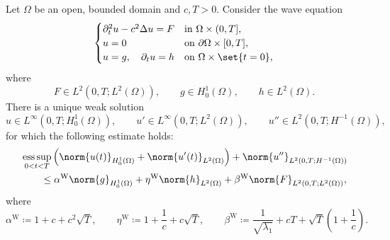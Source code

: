 \begin{theorem}\label{thm:wave-estimates}
Let \(\Omega\) be an open, bounded domain and $c, T > 0$. Consider the wave equation
\begin{equation}\label{eq:wave-general}
\begin{cases}
\partial_t^2 u-c^2\Delta u=F & \text{in }\Omega\times(0,T],\\
u=0 & \text{on }\partial\Omega\times[0,T],\\
u=g,\quad \partial_t u=h & \text{on }\Omega\times\set{t=0},
\end{cases}
\end{equation}
where
\[
    F\in L^2(0,T;L^2(\Omega)),
    \qquad
    g\in H_0^1(\Omega),
    \qquad
    h\in L^2(\Omega).
\]
There is a unique weak solution
\[
    u\in L^\infty(0,T;H_0^1(\Omega)),
    \qquad
    u'\in L^\infty(0,T;L^2(\Omega)),
    \qquad
    u''\in L^2(0,T;H^{-1}(\Omega)),
\]
for which the following estimate holds:
\begin{equation}\label{eq:explicit-wave-energy-estimate}
\begin{split}
    &\operatorname*{ess\,sup}_{0<t<T}
    \left(
        \norm{u(t)}_{H_0^1(\Omega)}
        +
        \norm{u'(t)}_{L^2(\Omega)}
    \right)
    +
    \norm{u''}_{L^2(0,T;H^{-1}(\Omega))}
    \\
    &\qquad\le
    \alpha^{\mathrm W}
    \norm{g}_{H_0^1(\Omega)}
    +
    \eta^{\mathrm W}
    \norm{h}_{L^2(\Omega)}
    +
    \beta^{\mathrm W}
    \norm{F}_{L^2(0,T;L^2(\Omega))},
\end{split}
\end{equation}
where
\begin{equation}\label{eq:wave-alpha-beta-constants}
    \alpha^{\mathrm W}\coloneqq 1+c+c^2\sqrt{T},
    \qquad
    \eta^{\mathrm W}\coloneqq 1+\frac1c+c\sqrt{T},
    \qquad
    \beta^{\mathrm W}\coloneqq \frac1{\sqrt{\lambda_1}} + cT
    +\sqrt{T}\left(1+\frac1c\right).
\end{equation}

\end{theorem}

